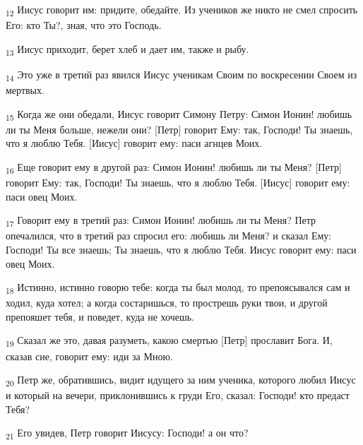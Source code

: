 \begin{tcolorbox}
\textsubscript{12} Иисус говорит им: придите, обедайте. Из учеников же никто не смел спросить Его: кто Ты?, зная, что это Господь.
\end{tcolorbox}
\begin{tcolorbox}
\textsubscript{13} Иисус приходит, берет хлеб и дает им, также и рыбу.
\end{tcolorbox}
\begin{tcolorbox}
\textsubscript{14} Это уже в третий раз явился Иисус ученикам Своим по воскресении Своем из мертвых.
\end{tcolorbox}
\begin{tcolorbox}
\textsubscript{15} Когда же они обедали, Иисус говорит Симону Петру: Симон Ионин! любишь ли ты Меня больше, нежели они? [Петр] говорит Ему: так, Господи! Ты знаешь, что я люблю Тебя. [Иисус] говорит ему: паси агнцев Моих.
\end{tcolorbox}
\begin{tcolorbox}
\textsubscript{16} Еще говорит ему в другой раз: Симон Ионин! любишь ли ты Меня? [Петр] говорит Ему: так, Господи! Ты знаешь, что я люблю Тебя. [Иисус] говорит ему: паси овец Моих.
\end{tcolorbox}
\begin{tcolorbox}
\textsubscript{17} Говорит ему в третий раз: Симон Ионин! любишь ли ты Меня? Петр опечалился, что в третий раз спросил его: любишь ли Меня? и сказал Ему: Господи! Ты все знаешь; Ты знаешь, что я люблю Тебя. Иисус говорит ему: паси овец Моих.
\end{tcolorbox}
\begin{tcolorbox}
\textsubscript{18} Истинно, истинно говорю тебе: когда ты был молод, то препоясывался сам и ходил, куда хотел; а когда состаришься, то прострешь руки твои, и другой препояшет тебя, и поведет, куда не хочешь.
\end{tcolorbox}
\begin{tcolorbox}
\textsubscript{19} Сказал же это, давая разуметь, какою смертью [Петр] прославит Бога. И, сказав сие, говорит ему: иди за Мною.
\end{tcolorbox}
\begin{tcolorbox}
\textsubscript{20} Петр же, обратившись, видит идущего за ним ученика, которого любил Иисус и который на вечери, приклонившись к груди Его, сказал: Господи! кто предаст Тебя?
\end{tcolorbox}
\begin{tcolorbox}
\textsubscript{21} Его увидев, Петр говорит Иисусу: Господи! а он что?
\end{tcolorbox}
